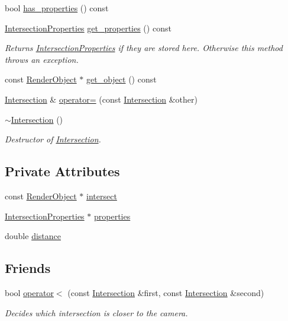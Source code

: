 \begin{DoxyCompactItemize}
bool \mbox{\hyperlink{classIntersection_a8d3d1d7310df69a465489b0e4141cb47}{has\+\_\+properties}} () const
\item 
\mbox{\hyperlink{classIntersectionProperties}{Intersection\+Properties}} \mbox{\hyperlink{classIntersection_aef86b4f9fcbad294d5615b246e719eca}{get\+\_\+properties}} () const
\begin{DoxyCompactList}\small\item\em Returns \mbox{\hyperlink{classIntersectionProperties}{Intersection\+Properties}} if they are stored here. Otherwise this method throws an exception. \end{DoxyCompactList}\item 
const \mbox{\hyperlink{classRenderObject}{Render\+Object}} $\ast$ \mbox{\hyperlink{classIntersection_abf3f81a8c11407f2777ccb5cce2068fb}{get\+\_\+object}} () const
\item 
\mbox{\hyperlink{classIntersection}{Intersection}} \& \mbox{\hyperlink{classIntersection_add5b6d995062799bd840c6486790c604}{operator=}} (const \mbox{\hyperlink{classIntersection}{Intersection}} \&other)
\item 
\mbox{\hyperlink{classIntersection_a064951a970ed8dd11081b2903ab62122}{$\sim$\+Intersection}} ()
\begin{DoxyCompactList}\small\item\em Destructor of \mbox{\hyperlink{classIntersection}{Intersection}}. \end{DoxyCompactList}\end{DoxyCompactItemize}
\subsection*{Private Attributes}
\begin{DoxyCompactItemize}
\item 
const \mbox{\hyperlink{classRenderObject}{Render\+Object}} $\ast$ \mbox{\hyperlink{classIntersection_a8241676dd0f240769dc189132dc3c5bb}{intersect}}
\item 
\mbox{\hyperlink{classIntersectionProperties}{Intersection\+Properties}} $\ast$ \mbox{\hyperlink{classIntersection_ad9d38892c2e47f51ae2497904050c00e}{properties}}
\item 
double \mbox{\hyperlink{classIntersection_a65da854f067b6f08175a97d262a17f1e}{distance}}
\end{DoxyCompactItemize}
\subsection*{Friends}
\begin{DoxyCompactItemize}
\item 
bool \mbox{\hyperlink{classIntersection_a955ab59fdb5154881d491eebc653250f}{operator$<$}} (const \mbox{\hyperlink{classIntersection}{Intersection}} \&first, const \mbox{\hyperlink{classIntersection}{Intersection}} \&second)
\begin{DoxyCompactList}\small\item\em Decides which intersection is closer to the camera. \end{DoxyCompactList}\end{DoxyCompactItemize}


